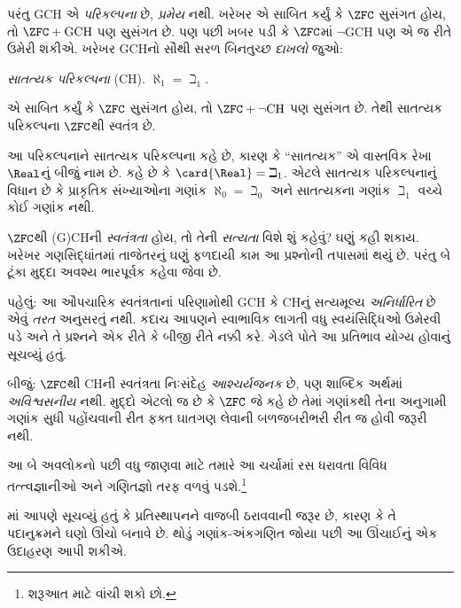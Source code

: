 પરંતુ GCH એ \emph{પરિકલ્પના} છે,
\emph{પ્રમેય} નથી. ખરેખર \citet{Godel1938}એ
સાબિત કર્યું કે $\ZFC$ સુસંગત હોય, તો
$\ZFC + \text{GCH}$ પણ સુસંગત છે. પણ પછી
ખબર પડી કે $\ZFC$માં $\lnot$GCH પણ એ જ રીતે
ઉમેરી શકીએ. ખરેખર GCHનો સૌથી સરળ બિનતુચ્છ
\emph{દાખલો} જુઓ:

\begin{defish}
\emph{સાતત્યક પરિકલ્પના} (CH).
$\aleph_1 = \beth_1$.
\end{defish}

\citet{Cohen1963}એ સાબિત કર્યું કે $\ZFC$
સુસંગત હોય, તો $\ZFC + \lnot\text{CH}$ પણ
સુસંગત છે. તેથી સાતત્યક પરિકલ્પના $\ZFC$થી
સ્વતંત્ર છે.

આ પરિકલ્પનાને સાતત્યક પરિકલ્પના કહે છે, કારણ કે
``સાતત્યક'' એ વાસ્તવિક રેખા $\Real$નું બીજું નામ છે.
 કહે છે કે
$\card{\Real} = \beth_1$. એટલે સાતત્યક
પરિકલ્પનાનું વિધાન છે કે પ્રાકૃતિક સંખ્યાઓના ગણાંક
$\aleph_0 = \beth_0$ અને સાતત્યકના ગણાંક
$\beth_1$ વચ્ચે કોઈ ગણાંક નથી.

$\ZFC$થી (G)CHની \emph{સ્વતંત્રતા} હોય, તો
તેની \emph{સત્યતા} વિશે શું કહેવું? ઘણું કહી શકાય.
ખરેખર ગણસિદ્ધાંતમાં તાજેતરનું ઘણું ફળદાયી કામ
આ પ્રશ્નોની તપાસમાં થયું છે. પરંતુ બે ટૂંકા મુદ્દા
અવશ્ય ભારપૂર્વક કહેવા જેવા છે.

પહેલું: આ ઔપચારિક સ્વતંત્રતાનાં પરિણામોથી GCH
કે CHનું સત્યમૂલ્ય \emph{અનિર્ધારિત} છે એવું
\emph{તરત} અનુસરતું નથી. કદાચ આપણને સ્વાભાવિક
લાગતી વધુ સ્વયંસિદ્ધિઓ ઉમેરવી પડે અને તે પ્રશ્નને
એક રીતે કે બીજી રીતે નક્કી કરે. ગેડલે પોતે આ
પ્રતિભાવ યોગ્ય હોવાનું સૂચવ્યું હતું.

બીજું: $\ZFC$થી CHની સ્વતંત્રતા નિઃસંદેહ
\emph{આશ્ચર્યજનક} છે, પણ શાબ્દિક અર્થમાં
\emph{અવિશ્વસનીય} નથી. મુદ્દો એટલો જ છે કે
$\ZFC$ જે કહે છે તેમાં ગણાંકથી તેના અનુગામી
ગણાંક સુધી પહોંચવાની રીત ફક્ત ઘાતગણ લેવાની
બળજબરીભરી રીત જ હોવી જરૂરી નથી.

આ બે અવલોકનો પછી વધુ જાણવા માટે તમારે આ
ચર્ચામાં રસ ધરાવતા વિવિધ તત્ત્વજ્ઞાનીઓ અને
ગણિતજ્ઞો તરફ વળવું પડશે.\footnote{શરૂઆત માટે
\citet[\S15.6]{Potter2004} વાંચી શકો છો.}
\endgroup

\begingroup
\makeatletter{}\makeatother

\label{guunit:OLP-0591}


માં આપણે સૂચવ્યું હતું કે
પ્રતિસ્થાપનને વાજબી ઠરાવવાની જરૂર છે, કારણ કે તે
પદાનુક્રમને ઘણો ઊંચો બનાવે છે. થોડું ગણાંક-અંકગણિત
જોયા પછી આ ઊંચાઈનું એક ઉદાહરણ આપી શકીએ.

